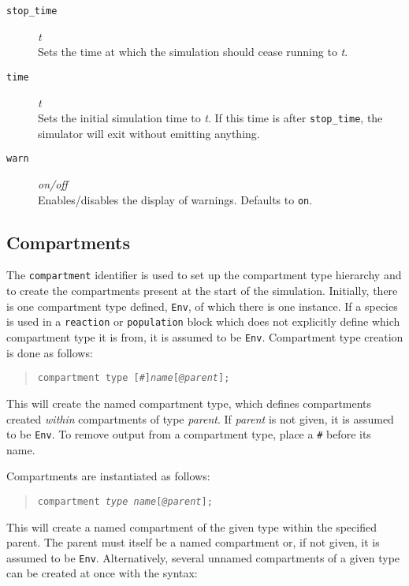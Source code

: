 \documentclass[10pt]{article}
\newcommand{\code}[1]{{\tt {#1}}}
\newcommand{\codeparam}[1]{\textrm{\textit{#1}}}
\newcommand{\optparam}[1]{\textrm{[\textit{#1}]}}
\begin{document}
\begin{description}
\item[\code{stop\_time}] \codeparam{t} \\
	Sets the time at which the simulation should cease running to \codeparam{t}.
\item[\code{time}] \codeparam{t} \\
	Sets the initial simulation time to \codeparam{t}. If this time is after \code{stop\_time}, the simulator will exit without emitting anything.
\item[\code{warn}] \codeparam{on/off} \\
	Enables/disables the display of warnings. Defaults to \code{on}.
\end{description}

\subsection{Compartments}
\label{sec:compartment}

The \code{compartment} identifier is used to set up the compartment type hierarchy and to create the compartments present at the start of the simulation. Initially, there is one compartment type defined, \code{Env}, of which there is one instance. If a species is used in a \code{reaction} or \code{population} block which does not explicitly define which compartment type it is from, it is assumed to be \code{Env}. Compartment type creation is done as follows:

\begin{quote}
\code{compartment type \optparam{\code{\#}}\codeparam{name}\optparam{@\codeparam{parent}};}
\end{quote}

This will create the named compartment type, which defines compartments created \emph{within} compartments of type \codeparam{parent}. If \codeparam{parent} is not given, it is assumed to be \code{Env}. To remove output from a compartment type, place a \code{\#} before its name.

Compartments are instantiated as follows:

\begin{quote}
\code{compartment \codeparam{type} \codeparam{name}\optparam{@\codeparam{parent}};}
\end{quote}

This will create a named compartment of the given type within the specified parent. The parent must itself be a named compartment or, if not given, it is assumed to be \code{Env}. Alternatively, several unnamed compartments of a given type can be created at once with the syntax:
\end{document}
